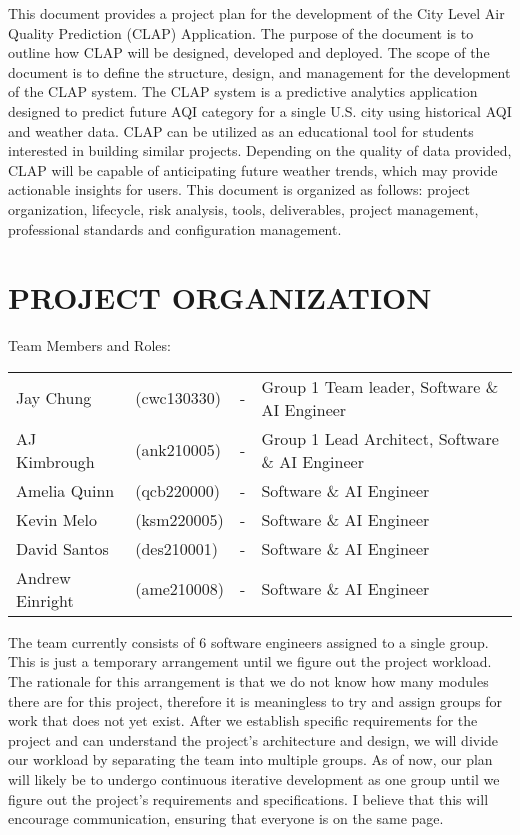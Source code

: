 \documentclass[11pt]{article}
\begin{document}
This document provides a project plan for the development of the City Level Air Quality Prediction (CLAP) Application. The purpose of the document is to outline how CLAP will be designed, developed and deployed. The scope of the document is to define the structure, design, and management for the development of the CLAP system. The CLAP system is a predictive analytics application designed to predict future AQI category for a single U.S. city using historical AQI and weather data. CLAP can be utilized as an educational tool for students interested in building similar projects. Depending on the quality of data provided, CLAP will be capable of anticipating future weather trends, which may provide actionable insights for users. This document is organized as follows: project organization, lifecycle, risk analysis, tools, deliverables, project management, professional standards and configuration management.

\section{PROJECT ORGANIZATION}
Team Members and Roles:

\begin{center}
    \begin{tabular}{l @{\hskip 1em} l @{\hskip 0.5in} l @{\hskip 0.5in} l}
        Jay Chung       & (cwc130330) & - & Group 1 Team leader, Software \& AI Engineer\\
        AJ Kimbrough    & (ank210005) & - & Group 1 Lead Architect, Software \& AI Engineer\\
        Amelia Quinn    & (qcb220000) & - & Software \& AI Engineer\\
        Kevin Melo      & (ksm220005) & - & Software \& AI Engineer\\
        David Santos    & (des210001) & - & Software \& AI Engineer\\
        Andrew Einright & (ame210008) & - & Software \& AI Engineer\\
    \end{tabular}
\end{center}

The team currently consists of 6 software engineers assigned to a single group. This is just a temporary arrangement until we figure out the project workload. The rationale for this arrangement is that we do not know how many modules there are for this project, therefore it is meaningless to try and assign groups for work that does not yet exist. After we establish specific requirements for the project and can understand the project’s architecture and design, we will divide our workload by separating the team into multiple groups. As of now, our plan will likely be to undergo continuous iterative development as one group until we figure out the project’s requirements and specifications. I believe that this will encourage communication, ensuring that everyone is on the same page.
\end{document}
